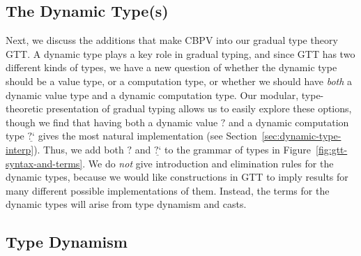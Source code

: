 \documentclass[acmsmall,screen,12pt]{acmart}
\newif\ifshort
\renewcommand{\u}{\underline}
\newcommand{\pipe}{\,\,|\,\,}
\newcommand{\ltdyn}{\sqsubseteq}
\newcommand{\gtdyn}{\sqsupseteq}
\newcommand{\equidyn}{\mathrel{\gtdyn\ltdyn}}
\newcommand{\dynv}{{?}}
\newcommand{\dync}{\u {\text{?`}}}
\newcommand{\err}{\mho}
\newcommand{\print}{\kw{print}}
\newcommand{\kw}[1]{\texttt{#1}\,\,}
\begin{document}

\ifshort \vspace{-0.1in} \fi
\subsection{The Dynamic Type(s)}

Next, we discuss the additions that make CBPV into our gradual type
theory GTT.  A dynamic type plays a key role in gradual typing, and
since GTT has two different kinds of types, we have a new question of
whether the dynamic type should be a value type, or a computation type,
or whether we should have \emph{both} a dynamic value type and a dynamic
computation type.
%
Our modular, type-theoretic presentation of gradual typing allows us to
easily explore these options, though we find that having
both a dynamic value $\dynv$ and a dynamic computation type $\dync$
gives the most natural implementation (see
Section~\ref{sec:dynamic-type-interp}).  Thus, we add both $\dynv$ and
$\dync$ to the grammar of types in
Figure~\ref{fig:gtt-syntax-and-terms}.  We do \emph{not} give
introduction and elimination rules for the dynamic types, because we
would like constructions in GTT to imply results for many different
possible implementations of them.  Instead, the terms for the dynamic
types will arise from type dynamism and casts.

\ifshort \vspace{-0.12in} \fi
\subsection{Type Dynamism}
\end{document}

